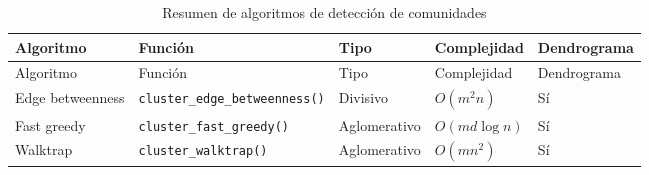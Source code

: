 \documentclass[
  letterpaper,
  DIV=11,
  numbers=noendperiod]{scrreprt}
\begin{document}
\begin{longtable}[]{@{}
  >{\raggedright\arraybackslash}p{}
  >{\raggedright\arraybackslash}p{}
  >{\raggedright\arraybackslash}p{}
  >{\raggedright\arraybackslash}p{}
  >{\raggedright\arraybackslash}p{}@{}}
\caption{Resumen de algoritmos de detección de
comunidades}\tabularnewline
\toprule\noalign{}
\begin{minipage}[b]{\linewidth}\raggedright
Algoritmo
\end{minipage} & \begin{minipage}[b]{\linewidth}\raggedright
Función
\end{minipage} & \begin{minipage}[b]{\linewidth}\raggedright
Tipo
\end{minipage} & \begin{minipage}[b]{\linewidth}\raggedright
Complejidad
\end{minipage} & \begin{minipage}[b]{\linewidth}\raggedright
Dendrograma
\end{minipage} \\
\midrule\noalign{}
\endfirsthead
\toprule\noalign{}
\begin{minipage}[b]{\linewidth}\raggedright
Algoritmo
\end{minipage} & \begin{minipage}[b]{\linewidth}\raggedright
Función
\end{minipage} & \begin{minipage}[b]{\linewidth}\raggedright
Tipo
\end{minipage} & \begin{minipage}[b]{\linewidth}\raggedright
Complejidad
\end{minipage} & \begin{minipage}[b]{\linewidth}\raggedright
Dendrograma
\end{minipage} \\
\midrule\noalign{}
\endhead
\bottomrule\noalign{}
\endlastfoot
Edge betweenness & \texttt{cluster\_edge\_betweenness()} & Divisivo &
\(O(m^2 n)\) & Sí \\
Fast greedy & \texttt{cluster\_fast\_greedy()} & Aglomerativo &
\(O(md \log n)\) & Sí \\
Walktrap & \texttt{cluster\_walktrap()} & Aglomerativo & \(O(mn^2)\) &
Sí \\

\end{longtable}
\end{document}
